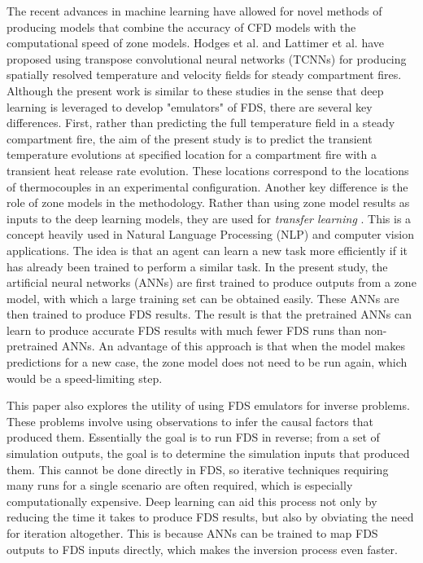 \documentclass{article}
\begin{document}
The recent advances in machine learning have allowed for novel methods of producing models that combine the accuracy of CFD models with the computational speed of zone models. Hodges et al. \cite{hodges2019compartment} and  Lattimer et al. \cite{lattimer2020using} have proposed using transpose convolutional neural networks (TCNNs) for producing spatially resolved temperature and velocity fields for steady compartment fires. Although the present work is similar to these studies in the sense that deep learning is leveraged to develop "emulators" of FDS, there are several key differences. First, rather than predicting the full temperature field in a steady compartment fire, the aim of the present study is to predict the transient temperature evolutions at specified location for a compartment fire with a transient heat release rate evolution. These locations correspond to the locations of thermocouples in an experimental configuration. Another key difference is the role of zone models in the methodology. Rather than using zone model results as inputs to the deep learning models, they are used for \textit{transfer learning} \cite{pan2009survey}. This is a concept heavily used in Natural Language Processing (NLP) \cite{ruder2019transfer} and computer vision \cite{gopalakrishnan2017deep} applications. The idea is that an agent can learn a new task more efficiently if it has already been trained to perform a similar task. In the present study, the artificial neural networks (ANNs) are first trained to produce outputs from a zone model, with which a large training set can be obtained easily. These ANNs are then trained to produce FDS results. The result is that the pretrained ANNs can learn to produce accurate FDS results with much fewer FDS runs than non-pretrained ANNs. An advantage of this approach is that when the model makes predictions for a new case, the zone model does not need to be run again, which would be a speed-limiting step. 

This paper also explores the utility of using FDS emulators for inverse problems. These problems involve using observations to infer the causal factors that produced them. Essentially the goal is to run FDS in reverse; from a set of simulation outputs, the goal is to determine the simulation inputs that produced them. This cannot be done directly in FDS, so iterative techniques requiring many runs for a single scenario are often required, which is especially computationally expensive. Deep learning can aid this process not only by reducing the time it takes to produce FDS results, but also by obviating the need for iteration altogether. This is because ANNs can be trained to map FDS outputs to FDS inputs directly, which makes the inversion process even faster. 
\end{document}
